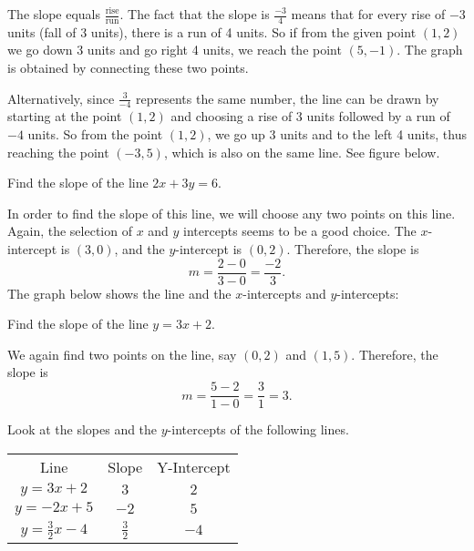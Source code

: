 \begin{solution} The slope equals $\frac{\text{rise}}{\text{run}}$. The fact that the slope is $\frac{-3}{4}$ means that for every rise of $-3$ units (fall of 3 units), there is a run of 4 units. So if from the given point $(1, 2)$ we go down 3 units and go right 4 units, we reach the point $(5, -1)$. The graph is obtained by connecting these two points.


Alternatively, since $\frac{3}{-4}$ represents the same number, the line can be drawn by starting at the point $(1, 2)$ and choosing a rise of 3 units followed by a run of $-4$ units. So from the point $(1, 2)$, we go up 3 units and to the left 4 units, thus reaching the point $(-3, 5)$, which is also on the same line. See figure below.

\end{solution}
\begin{example}
Find the slope of the line $2x + 3y = 6$.	
\end{example}

\begin{solution}
In order to find the slope of this line, we will choose any two points on this line.
Again, the selection of $x$ and $y$ intercepts seems to be a good choice. The $x$-intercept is $(3, 0)$, and the $y$-intercept is $(0, 2)$. Therefore, the slope is
\[ m = \frac{2 - 0}{3 - 0} = \frac{-2}{3} .\]
The graph below shows the line and the $x$-intercepts and $y$-intercepts: 
\end{solution}

\begin{example}
Find the slope of the line $y = 3x + 2$.
\end{example}

\begin{solution} We again find two points on the line, say $(0, 2)$ and $(1, 5)$.
Therefore, the slope is
\[ m = \frac{5 - 2}{1 - 0} = \frac{3}{1} = 3.\]
\end{solution}
Look at the slopes and the $y$-intercepts of the following lines.
\begin{center}

\begin{tabular}{ccc}
Line & Slope & Y-Intercept \\
$y = 3x + 2$ & $3$ & $2$ \\
$y = -2x + 5$ & $-2$ & $5$ \\
$y = \frac{3}{2}x - 4$ & $\frac{3}{2}$ & $-4$
\end{tabular}
\end{center}

